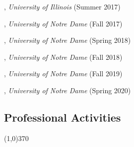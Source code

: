 \documentclass[10pt]{article}
\newenvironment{myindentpar}[1]%
{\begin{list}{}%
         {\setlength{\leftmargin}{#1}}%
         \item[]%
}
{\end{list}}
\newcounter{list}
\newcommand{\hide}[1]{}
\begin{document}
\begin{myindentpar}{0.75cm}

\hspace{-0.75cm}{\bf CS 412 Introduction to Data Mining}, \emph{University of Illinois} (Summer 2017)
	
\hspace{-0.75cm}{\bf CSE 40647/60647 Data Science}, \emph{University of Notre Dame} (Fall 2017)

\hspace{-0.75cm}{\bf CSE 40647/60647 Data Science}, \emph{University of Notre Dame} (Spring 2018)

\hspace{-0.75cm}{\bf CSE 40647/60647 Data Science}, \emph{University of Notre Dame} (Fall 2018)

\hspace{-0.75cm}{\bf CSE 40647/60647 Data Science}, \emph{University of Notre Dame} (Fall 2019)

\hspace{-0.75cm}{\bf CSE 60XXX Computational Behavior Modeling}, \emph{University of Notre Dame} (Spring 2020)

\end{myindentpar}

\hide{
\subsection{\sc Media Coverage}
\vspace{-0.4cm} \line(1,0){370} \vspace{-0.1cm}

\begin{myindentpar}{0.75cm}
{\em With modern media, press coverage sometimes spreads far and wide. There are often more outlets reporting than can be captured. This section therefore lists only a representative article (or two) of the total press coverage.}

\hspace{-0.75cm} XXX (XXX 2019) 
\hspace{0.75cm}{\em XXX}

\hspace{-0.75cm} XXX (XXX 2019) 

\url{https://www.XXX.com/}

\end{myindentpar}
}

\subsection{\sc Professional Activities}
\vspace{-0.4cm} \line(1,0){370} \vspace{-0.1cm}
\end{document}
